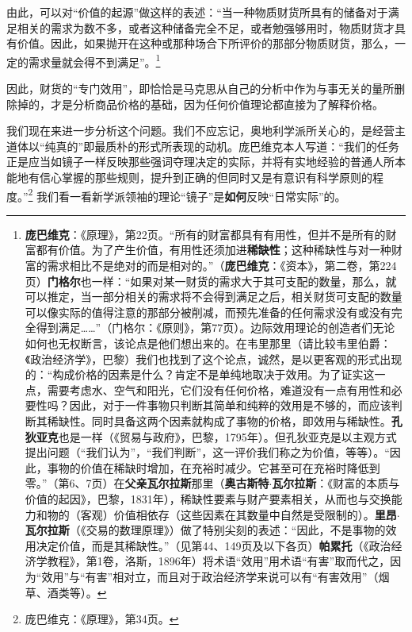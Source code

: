 \documentclass[fontset=fandol, a4paper, 12pt, openright]{ctexbook}
\begin{document}
由此，可以对“价值的起源”做这样的表述：“当一种物质财货所具有的储备对于满足相关的需求为数不多，或者这种储备完全不足，或者勉强够用时，物质财货才具有价值。因此，如果抛开在这种或那种场合下所评价的那部分物质财货，那么，一定的需求量就会得不到满足”。\footnote{\textbf{庞巴维克}：《原理》，第22页。“所有的财富都具有有用性，但并不是所有的财富都有价值。为了产生价值，有用性还须加进\textbf{稀缺性}；这种稀缺性与对一种财富的需求相比不是绝对的而是相对的。”（\textbf{庞巴维克}：《资本》，第二卷，第224页）\textbf{门格尔}也一样：“如果对某一财货的需求大于其可支配的数量，那么，就可以推定，当一部分相关的需求将不会得到满足之后，相关财货可支配的数量可以像实际的值得注意的那部分被削减，而预先准备的任何需求没有或没有完全得到满足……”（门格尔：《原则》，第77页）。边际效用理论的创造者们无论如何也无权断言，该论点是他们想出来的。在韦里那里（请比较韦里伯爵：《政治经济学》，巴黎）我们也找到了这个论点，诚然，是以更客观的形式出现的：“构成价格的因素是什么？肯定不是单纯地取决于效用。为了证实这一点，需要考虑水、空气和阳光，它们没有任何价格，难道没有一点有用性和必要性吗？因此，对于一件事物只判断其简单和纯粹的效用是不够的，而应该判断其稀缺性。同时具备这两个因素就构成了事物的价格，即效用与稀缺性。\textbf{孔狄亚克}也是一样（《贸易与政府》，巴黎，1795年）。但孔狄亚克是以主观方式提出问题（“我们认为”，“我们判断”，这一评价我们称之为价值，等等）。“因此，事物的价值在稀缺时增加，在充裕时减少。它甚至可在充裕时降低到零。”（第6、7页）在\textbf{父亲瓦尔拉斯}那里（\textbf{奥古斯特}$\cdot$\textbf{瓦尔拉斯}：《财富的本质与价值的起因》，巴黎，1831年），稀缺性要素与财产要素相关，从而也与交换能力和物的（客观）价值相依存（这些因素在其数量中自然是受限制的）。\textbf{里昂}$\cdot$\textbf{瓦尔拉斯}（《交易的数理原理》）做了特别尖刻的表述：“因此，不是事物的效用决定价值，而是其稀缺性。”（见第44、149页及以下各页）\textbf{帕累托}（《政治经济学教程》，第1卷，洛斯，1896年）将术语“效用”用术语“有害”取而代之，因为“效用”与“有害”相对立，而且对于政治经济学来说可以有“有害效用”（烟草、酒类等）。}

因此，财货的“专门效用”，即恰恰是马克思从自己的分析中作为与事无关的量所删除掉的，才是分析商品价格的基础，因为任何价值理论都直接为了解释价格。

我们现在来进一步分析这个问题。我们不应忘记，奥地利学派所关心的，是经营主道体以“纯真的”即最质朴的形式所表现的动机。庞巴维克本人写道：“我们的任务正是应当如镜子一样反映那些强词夺理决定的实际，并将有实地经验的普通人所本能地有信心掌握的那些规则，提升到正确的但同时又是有意识有科学原则的程度。”\footnote{庞巴维克：《原理》，第34页。} 我们看一看新学派领袖的理论“镜子”是\textbf{如何}反映“日常实际”的。
\end{document}
